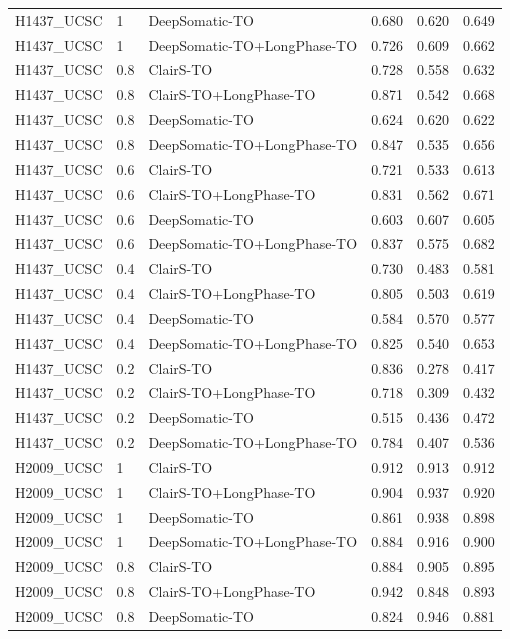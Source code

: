 \documentclass[pdflatex,sn-nature]{sn-jnl}
\begin{document}
{\begin{longtable}{@{}lllccc@{}}
  H1437\_UCSC & 1 & DeepSomatic-TO & 0.680 & 0.620 & 0.649 \\
  H1437\_UCSC & 1 & DeepSomatic-TO+LongPhase-TO & 0.726 & 0.609 & 0.662 \\
  H1437\_UCSC & 0.8 & ClairS-TO & 0.728 & 0.558 & 0.632 \\
  H1437\_UCSC & 0.8 & ClairS-TO+LongPhase-TO & 0.871 & 0.542 & 0.668 \\
  H1437\_UCSC & 0.8 & DeepSomatic-TO & 0.624 & 0.620 & 0.622 \\
  H1437\_UCSC & 0.8 & DeepSomatic-TO+LongPhase-TO & 0.847 & 0.535 & 0.656 \\
  H1437\_UCSC & 0.6 & ClairS-TO & 0.721 & 0.533 & 0.613 \\
  H1437\_UCSC & 0.6 & ClairS-TO+LongPhase-TO & 0.831 & 0.562 & 0.671 \\
  H1437\_UCSC & 0.6 & DeepSomatic-TO & 0.603 & 0.607 & 0.605 \\
  H1437\_UCSC & 0.6 & DeepSomatic-TO+LongPhase-TO & 0.837 & 0.575 & 0.682 \\
  H1437\_UCSC & 0.4 & ClairS-TO & 0.730 & 0.483 & 0.581 \\
  H1437\_UCSC & 0.4 & ClairS-TO+LongPhase-TO & 0.805 & 0.503 & 0.619 \\
  H1437\_UCSC & 0.4 & DeepSomatic-TO & 0.584 & 0.570 & 0.577 \\
  H1437\_UCSC & 0.4 & DeepSomatic-TO+LongPhase-TO & 0.825 & 0.540 & 0.653 \\
  H1437\_UCSC & 0.2 & ClairS-TO & 0.836 & 0.278 & 0.417 \\
  H1437\_UCSC & 0.2 & ClairS-TO+LongPhase-TO & 0.718 & 0.309 & 0.432 \\
  H1437\_UCSC & 0.2 & DeepSomatic-TO & 0.515 & 0.436 & 0.472 \\
  H1437\_UCSC & 0.2 & DeepSomatic-TO+LongPhase-TO & 0.784 & 0.407 & 0.536 \\
  H2009\_UCSC & 1 & ClairS-TO & 0.912 & 0.913 & 0.912 \\
  H2009\_UCSC & 1 & ClairS-TO+LongPhase-TO & 0.904 & 0.937 & 0.920 \\
  H2009\_UCSC & 1 & DeepSomatic-TO & 0.861 & 0.938 & 0.898 \\
  H2009\_UCSC & 1 & DeepSomatic-TO+LongPhase-TO & 0.884 & 0.916 & 0.900 \\
  H2009\_UCSC & 0.8 & ClairS-TO & 0.884 & 0.905 & 0.895 \\
  H2009\_UCSC & 0.8 & ClairS-TO+LongPhase-TO & 0.942 & 0.848 & 0.893 \\
  H2009\_UCSC & 0.8 & DeepSomatic-TO & 0.824 & 0.946 & 0.881 \\

\end{longtable}}
\end{document}
